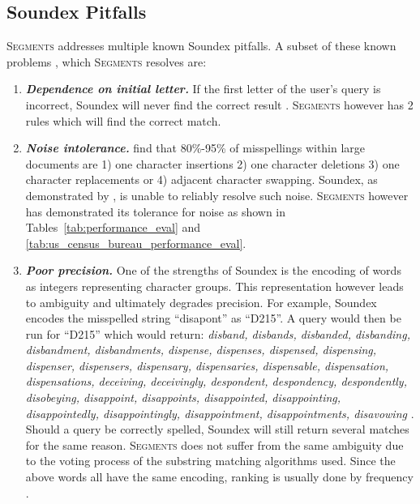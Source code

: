 \documentclass{endm}
\begin{document}
\begin{CJK}{UTF8}{song}

\subsection{Soundex Pitfalls} %
\label{sub:soundex_s_pitfalls}


S\textsc{egments} addresses multiple known Soundex pitfalls.  
A subset of these known problems \cite{patman:is}, which S\textsc{egments} resolves are:


\begin{enumerate}
	\item \textbf{\emph{Dependence on initial letter.}}  If the first letter of the user's query is incorrect, Soundex will never find the correct result \cite{patman:is}.  S\textsc{egments} however has 2 rules which will find the correct match.
	\item \textbf{\emph{Noise intolerance.}}  \cite{damerau:a,mitton:spellchecking,pollock:automatic} find that 80\%-95\% of misspellings within large documents are 1) one character insertions 2) one character deletions 3) one character replacements or 4) adjacent character swapping.  Soundex, as demonstrated by \cite{patman:is}, is unable to reliably resolve such noise.  S\textsc{egments} however has demonstrated its tolerance for noise as shown in Tables~\ref{tab:performance_eval} and \ref{tab:us_census_bureau_performance_eval}.
	\item \textbf{\emph{Poor precision.}}  One of the strengths of Soundex is the encoding of words as integers representing character groups.  This representation however leads to ambiguity and ultimately degrades precision.  For example, Soundex encodes the misspelled string ``disapont'' as ``D215''.  A query would then be run for ``D215'' which would return: \textit{disband, disbands, disbanded, disbanding, disbandment, disbandments, dispense, dispenses, dispensed, dispensing, dispenser, dispensers, dispensary, dispensaries, dispensable, dispensation, dispensations, deceiving, deceivingly, despondent, despondency, despondently, disobeying, disappoint, disappoints, disappointed, disappointing, disappointedly, disappointingly, disappointment, disappointments, disavowing} \cite{mitton:spellchecking}.  Should a query be correctly spelled, Soundex will still return several matches for the same reason.  S\textsc{egments} does not suffer from the same ambiguity due to the voting process of the substring matching algorithms used.  Since the above words all have the same encoding, ranking is usually done by frequency \cite{chakkrit:novel}.
\end{enumerate}


\end{CJK}
\end{document}
